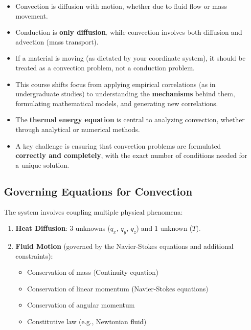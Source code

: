 \begin{itemize}
    \item Convection is diffusion with motion, whether due to fluid flow or mass movement.
    \item Conduction is \textbf{only diffusion}, while convection involves both diffusion and advection (mass transport).
    \item If a material is moving (as dictated by your coordinate system), it should be treated as a convection problem, not a conduction problem.
    \item This course shifts focus from applying empirical correlations (as in undergraduate studies) to understanding the \textbf{mechanisms} behind them, formulating mathematical models, and generating new correlations.
    \item The \textbf{thermal energy equation} is central to analyzing convection, whether through analytical or numerical methods.
    \item A key challenge is ensuring that convection problems are formulated \textbf{correctly and completely}, with the exact number of conditions needed for a unique solution.
\end{itemize}
\subsection*{Governing Equations for Convection}
The system involves coupling multiple physical phenomena:

\begin{enumerate}
    \item \textbf{Heat Diffusion}: 3 unknowns ($q_x$, $q_y$, $q_z$) and 1 unknown ($T$).
    \item \textbf{Fluid Motion} (governed by the Navier-Stokes equations and additional constraints):
    \begin{itemize}
        \item Conservation of mass (Continuity equation)
        \item Conservation of linear momentum (Navier-Stokes equations)
        \item Conservation of angular momentum
        \item Constitutive law (e.g., Newtonian fluid)
    \end{itemize}
\end{enumerate}
